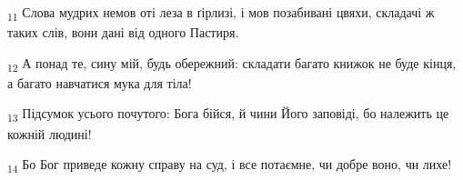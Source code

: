 \begin{tcolorbox}
\textsubscript{11} Слова мудрих немов оті леза в ґірлизі, і мов позабивані цвяхи, складачі ж таких слів, вони дані від одного Пастиря.
\end{tcolorbox}
\begin{tcolorbox}
\textsubscript{12} А понад те, сину мій, будь обережний: складати багато книжок не буде кінця, а багато навчатися мука для тіла!
\end{tcolorbox}
\begin{tcolorbox}
\textsubscript{13} Підсумок усього почутого: Бога бійся, й чини Його заповіді, бо належить це кожній людині!
\end{tcolorbox}
\begin{tcolorbox}
\textsubscript{14} Бо Бог приведе кожну справу на суд, і все потаємне, чи добре воно, чи лихе!
\end{tcolorbox}
